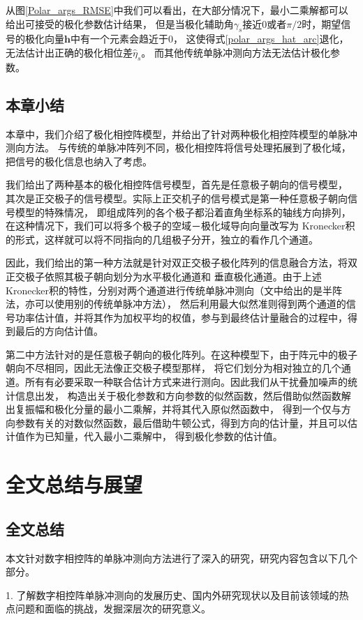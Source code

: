 \documentclass[master]{thesis-uestc}
\begin{document}
从图\ref{Polar_args_RMSE}中我们可以看出，在大部分情况下，最小二乘解都可以给出可接受的极化参数估计结果，
但是当极化辅助角$\gamma_s$接近0或者$\pi/2$时，期望信号的极化向量$\bm{h}$中有一个元素会趋近于0，
这使得式\eqref{polar_args_hat_arc}退化，无法估计出正确的极化相位差$\hat{\eta}_s$。
而其他传统单脉冲测向方法无法估计极化参数。

\section{本章小结}
本章中，我们介绍了极化相控阵模型，并给出了针对两种极化相控阵模型的单脉冲测向方法。
与传统的单脉冲阵列不同，极化相控阵将信号处理拓展到了极化域，把信号的极化信息也纳入了考虑。

我们给出了两种基本的极化相控阵信号模型，首先是任意极子朝向的信号模型，
其次是正交极子的信号模型。实际上正交机子的信号模式是第一种任意极子朝向信号模型的特殊情况，
即组成阵列的各个极子都沿着直角坐标系的轴线方向排列，在这种情况下，我们可以将多个极子的空域－极化域导向向量改写为
Kronecker积的形式，这样就可以将不同指向的几组极子分开，独立的看作几个通道。

因此，我们给出的第一种方法就是针对双正交极子极化阵列的信息融合方法，将双正交极子依照其极子朝向划分为水平极化通道和
垂直极化通道。由于上述Kronecker积的特性，分别对两个通道进行传统单脉冲测向（文中给出的是半阵法，亦可以使用别的传统单脉冲方法），
然后利用最大似然准则得到两个通道的信号功率估计值，并将其作为加权平均的权值，参与到最终估计量融合的过程中，得到最后的方向估计值。

第二中方法针对的是任意极子朝向的极化阵列。在这种模型下，由于阵元中的极子朝向不尽相同，因此无法像正交极子模型那样，
将它们划分为相对独立的几个通道。所有有必要采取一种联合估计方式来进行测向。因此我们从干扰叠加噪声的统计信息出发，
构造出关于极化参数和方向参数的似然函数，然后借助似然函数解出复振幅和极化分量的最小二乘解，并将其代入原似然函数中，
得到一个仅与方向参数有关的对数似然函数，最后借助牛顿公式，得到方向的估计量，并且可以估计值作为已知量，代入最小二乘解中，
得到极化参数的估计值。

\chapter{全文总结与展望}
\section{全文总结}
本文针对数字相控阵的单脉冲测向方法进行了深入的研究，研究内容包含以下几个部分。

1. 了解数字相控阵单脉冲测向的发展历史、国内外研究现状以及目前该领域的热点问题和面临的挑战，发掘深层次的研究意义。
\end{document}
